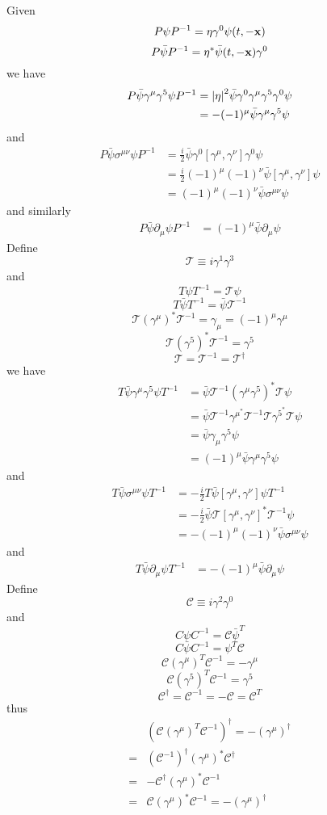 \documentclass{article}
\newcommand{\gm}{\gamma^{\mu}}
\newcommand{\gn}{\gamma^{\nu}}
\newcommand{\g}{\gamma}
\newcommand{\s}{\sigma}
\newcommand{\Tscr}{\mathscr{T}}
\newcommand{\Cscr}{\mathscr{C}}
\begin{document}
Given
$$P\psi P^{-1}=\eta\g^0\psi(t,-\vb{x})$$
$$P\bar\psi P^{-1}=\eta^*\bar\psi(t,-\vb{x}) \g^0$$
we have
\begin{align*}
  P\bar\psi\gm\g^5\psi P^{-1}&=\abs{\eta}^2\bar\psi\g^0\gm\g^5\g^0\psi\\
  &=-(-1)^{\mu}\bar\psi\gm\g^5\psi
\end{align*}
and
\begin{align*}
  P\bar\psi\s^{\mu\nu}\psi P^{-1}&=\frac{i}{2}\bar\psi\g^0[\gm,\gn]\g^0\psi\\
  &=\frac{i}{2}(-1)^{\mu}(-1)^{\nu}\bar\psi[\g^{\mu},\gn]\psi\\
  &=(-1)^{\mu}(-1)^{\nu}\bar\psi\s^{\mu\nu}\psi
\end{align*}
and similarly
\begin{align*}
  P\bar\psi\partial_{\mu}\psi P^{-1}&=(-1)^{\mu}\bar\psi\partial_{\mu}\psi
\end{align*}
Define
$$\Tscr\equiv i\g^1\g^3$$
and
$$T\psi T^{-1}=\Tscr\psi$$
$$T\bar\psi T^{-1}=\bar\psi\Tscr^{-1}$$
$$\Tscr(\gm)^*\Tscr^{-1}=\g_{\mu}=(-1)^{\mu}\gm$$
$$\Tscr(\g^5)^*\Tscr^{-1}=\g^5$$
$$\Tscr=\Tscr^{-1}=\Tscr^{\dagger}$$
we have
\begin{align*}
  T\bar\psi\gm\g^5\psi T^{-1}&=\bar\psi\Tscr^{-1}(\gm\g^5)^*\Tscr\psi\\
  &=\bar\psi\Tscr^{-1}\gm^*\Tscr^{-1}\Tscr\g^5^*\Tscr\psi\\
  &=\bar\psi\g_{\mu}\g^5\psi\\
  &=(-1)^{\mu}\bar\psi\gm\g^5\psi
\end{align*}
and
\begin{align*}
  T\bar\psi\s^{\mu\nu}\psi T^{-1}&=-\frac{i}{2}T\bar\psi[\gm,\gn]\psi T^{-1}\\
  &=-\frac{i}{2}\bar\psi\Tscr[\gm,\gn]^*\Tscr^{-1}\psi\\
  &=-(-1)^{\mu}(-1)^{\nu}\bar\psi\s^{\mu\nu}\psi
\end{align*}
and
\begin{align*}
  T\bar\psi\partial_{\mu}\psi T^{-1}&=-(-1)^{\mu}\bar\psi\partial_{\mu}\psi
\end{align*}
Define
$$\Cscr\equiv i\g^2\g^0$$
and
$$C\psi C^{-1}=\Cscr\bar\psi^T$$
$$C\bar\psi C^{-1}=\psi^T\Cscr$$
$$\Cscr(\gm)^T\Cscr^{-1}=-\gm$$
$$\Cscr(\g^5)^T\Cscr^{-1}=\g^5$$
$$\Cscr^{\dagger}=\Cscr^{-1}=-\Cscr=\Cscr^T$$
thus
\begin{align*}
  &(\Cscr(\gm)^T\Cscr^{-1})^{\dagger}=-(\gm)^{\dagger}\\
  =&(\Cscr^{-1})^{\dagger}(\gm)^*\Cscr^{\dagger}\\
  =&-\Cscr^{\dagger}(\gm)^*\Cscr^{-1}\\
  =&\Cscr(\gm)^*\Cscr^{-1}=-(\gm)^{\dagger}
\end{align*}
\end{document}
